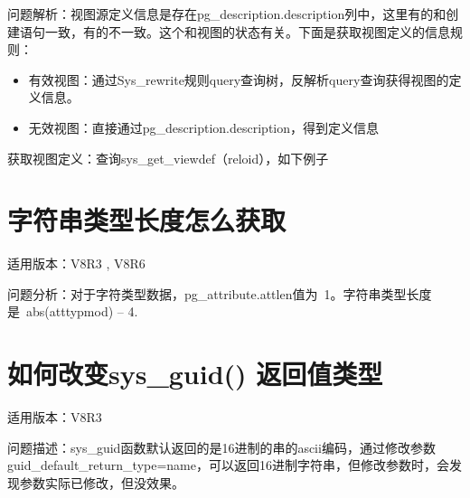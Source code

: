 \documentclass[letterpaper,10pt,english]{sphinxmanual}
\begin{document}
问题解析：视图源定义信息是存在pg\_description.description列中，这里有的和创建语句一致，有的不一致。这个和视图的状态有关。下面是获取视图定义的信息规则：
\begin{itemize}
\item {} 
有效视图：通过Sys\_rewrite规则query查询树，反解析query查询获得视图的定义信息。

\item {} 
无效视图：直接通过pg\_description.description，得到定义信息

\end{itemize}

获取视图定义：查询sys\_get\_viewdef（reloid），如下例子

\begin{sphinxVerbatim}[commandchars=\\\{\}]
      
 
 
    
\end{sphinxVerbatim}


\section{字符串类型长度怎么获取}
\label{\detokenize{sql:id19}}
适用版本：V8R3 , V8R6

问题分析：对于字符类型数据，pg\_attribute.attlen值为 \sphinxhyphen{}1。字符串类型长度是 abs(atttypmod) – 4.


\section{如何改变sys\_guid() 返回值类型}
\label{\detokenize{sql:sys-guid}}
适用版本：V8R3

问题描述：sys\_guid函数默认返回的是16进制的串的ascii编码，通过修改参数guid\_default\_return\_type=name，可以返回16进制字符串，但修改参数时，会发现参数实际已修改，但没效果。
\end{document}
